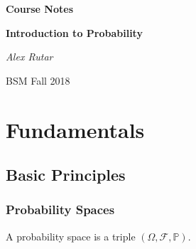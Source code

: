 \documentclass[12pt, a4paper]{book}
\theoremstyle{nonumberplain}
\newcommand{\assignmentname}{Course Notes}
\newcommand{\classname}{Introduction to Probability}
\newcommand{\semester}{BSM Fall 2018}
\begin{document}
\begin{titlepage}
    \centering
    \vspace{5cm}
    {\huge\textbf{\assignmentname}\par} %
    \vspace{2cm}
    {\Large\textbf{\classname}\par} %
    \vspace{3cm}
    {\Large\textit{Alex Rutar}\par}

    \vfill

    {\large \semester \par} %
\end{titlepage}
{}
\tableofcontents
{}
\chapter{Fundamentals}
\section{Basic Principles}
\subsection{Probability Spaces}
A probability space is a triple $(\Omega,\mathcal{F},\mathbb{P})$.
\end{document}
